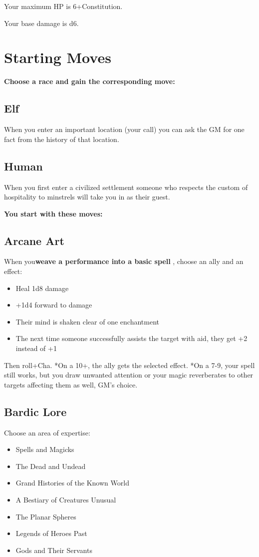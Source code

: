  Your maximum HP is 6+Constitution.


 Your base damage is d6.
\section*{Starting Moves}
{\bfseries Choose a race and gain the corresponding move:}
\subsection{Elf}


 When you enter an important location (your call) you can ask the GM for one fact from the history of that location.
\subsection{Human}


 When you first enter a civilized settlement someone who respects the custom of hospitality to minstrels will take you in as their guest.


\vspace{\baselineskip}
{\bfseries You start with these moves:}
\subsection{Arcane Art} 


 When you\textbf{weave a performance into a basic spell}
, choose an ally and an effect:
\begin{itemize}
\item Heal 1d8 damage
\item +1d4 forward to damage
\item Their mind is shaken clear of one enchantment
\item The next time someone successfully assists the target with aid, they get +2 instead of +1

\end{itemize}


 Then roll+Cha. *On a 10+, the ally gets the selected effect. *On a 7-9, your spell still works, but you draw unwanted attention or your magic reverberates to other targets affecting them as well, GM's choice.
\subsection{Bardic Lore}


 Choose an area of expertise:
\begin{itemize}
\item Spells and Magicks
\item The Dead and Undead
\item Grand Histories of the Known World
\item A Bestiary of Creatures Unusual
\item The Planar Spheres
\item Legends of Heroes Past
\item Gods and Their Servants

\end{itemize}



